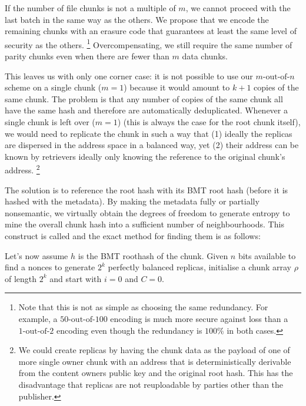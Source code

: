 If the number of file chunks is not a multiple of $m$, we cannot proceed with the last batch in the same way as the others. We propose that we encode the remaining chunks with an erasure code that guarantees at least the same level of security as the others.%
%
\footnote{Note that this is not as simple as choosing the same redundancy. For example, a $50\text{-out-of-}100$ encoding is much more secure against loss than a $1\text{-out-of-}2$ encoding even though the redundancy is $100\%$ in both cases.} 
%
Overcompensating, we still require the same number of parity chunks even when there are fewer than $m$ data chunks.

This leaves us with only one corner case: it is not possible to use our $m\text{-out-of-}n$ scheme on a single chunk ($m=1$) because it would amount to $k+1$ copies of the same chunk. The problem is that any number of copies of the same chunk all have the same hash and therefore are automatically deduplicated. Whenever a single chunk is left over ($m=1$) (this is always the case for the root chunk itself), we would need to replicate the chunk in such a way that (1) ideally the replicas are dispersed in the address space in a balanced way, yet (2) their address can be known by retrievers ideally only knowing the reference to the original chunk's address.%
%
\footnote{We could create  replicas by having the chunk data as the payload of one of more single owner chunk with an address that is deterministically derivable from the content owners public key and the original root hash. This has the disadvantage that replicas are not reuploadable by parties other than the publisher.}

The solution is to reference the root hash with its BMT root hash (before it is hashed with the metadata). By making the metadata fully or partially nonsemantic, we virtually obtain the degrees of freedom to generate entropy to mine the overall chunk hash into a sufficient number of neighbourhoods. This construct is called  and the exact method for finding them is as follows:

Let's now assume $h$ is the BMT roothash of the chunk.
Given $n$ bits available to find a nonces to generate  $2^k$  perfectly balanced replicas, initialise a chunk array $\rho$ of length $2^k$ and start with $i=0$ and $C=0$.

